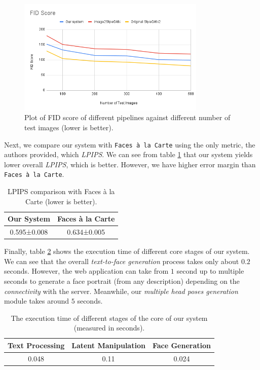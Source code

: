 \begin{figure}[H]
    \centering
    \includegraphics[width=0.8\textwidth]{images/fid_score.png}
    \caption{Plot of FID score of different pipelines against different number of test images (lower is better).}
    \label{fig:fid}
\end{figure}

Next, we compare our system with \texttt{Faces à la Carte} using the only metric, the authors provided, which \emph{LPIPS}. We can see from table \ref{tab:lpips_comp} that our system yields lower overall \emph{LPIPS}, which is better. However, we have higher error margin than \texttt{Faces à la Carte}.

\begin{table}[ht]
\centering
\begin{tabular}[t]{| c | c |}
\hline
Our System & Faces à la Carte \\
\hline
\hline
0.595±0.008 & 0.634±0.005 \\
\hline
\end{tabular}
\caption{LPIPS comparison with Faces à la Carte (lower is better).}
\label{tab:lpips_comp}
\end{table}

Finally, table \ref{tab:exec_time} shows the execution time of different core stages of our system. We can see that the overall \emph{text-to-face generation} process takes only about $0.2$ seconds. However, the web application can take from $1$ second up to multiple seconds to generate a face portrait (from any description) depending on the \emph{connectivity} with the server. Meanwhile, our \emph{multiple head poses generation} module takes around $5$ seconds.

\begin{table}[ht]
\centering
\begin{tabular}[t]{| c | c | c |}
\hline
Text Processing & Latent Manipulation & Face Generation \\
\hline
\hline
0.048 & 0.11 & 0.024 \\
\hline
\end{tabular}
\caption{The execution time of different stages of the core of our system (measured in seconds).}
\label{tab:exec_time}
\end{table}
